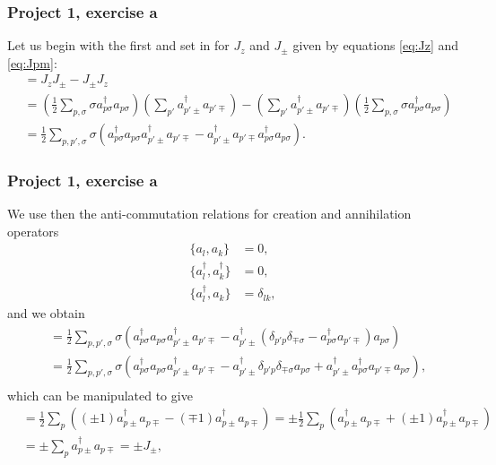 \documentclass[compress]{beamer}
\begin{document}
\frame
{
\frametitle{Project 1, exercise a}

\begin{small}
{\scriptsize
Let us begin with the first and set in for $J_z$ and $J_\pm$ given by equations \eqref{eq:Jz} and \eqref{eq:Jpm}:
\begin{align*}
[J_z,J_\pm] &= J_z J_\pm - J_\pm J_z \\
%
&= \left( \frac{1}{2}\sum_{p,\sigma} \sigma a_{p\sigma}^\dagger a_{p\sigma} \right)
\left( \sum_{p'} a_{p'\pm}^\dagger a_{p'\mp} \right) -
\left( \sum_{p'} a_{p'\pm}^\dagger a_{p'\mp} \right)
\left( \frac{1}{2}\sum_{p,\sigma} \sigma a_{p\sigma}^\dagger a_{p\sigma} \right) \\
%
&= \frac{1}{2} \sum_{p,p',\sigma} \sigma \left( a_{p\sigma}^\dagger a_{p\sigma} a_{p'\pm}^\dagger a_{p'\mp} - a_{p'\pm}^\dagger a_{p'\mp} a_{p\sigma}^\dagger a_{p\sigma} \right).
\end{align*}
%

}
\end{small}
}


\frame
{
\frametitle{Project 1, exercise a}

\begin{small}
{\scriptsize
We use then the anti-commutation relations for creation and annihilation operators
\begin{align}
\{ a_l,a_k \} &= 0, \label{eq:al,ak} \\
\{ a_l^\dagger , a_k^\dagger \} &= 0, \label{eq:ald,akd} \\
\{ a_l^\dagger , a_k \} &= \delta_{lk}, \label{eq:ald,ak}
\end{align}
and we obtain
%
\begin{align*}
[J_z,J_\pm] &= \frac{1}{2} \sum_{p,p',\sigma} \sigma \left(
a_{p\sigma}^\dagger a_{p\sigma} a_{p'\pm}^\dagger a_{p'\mp} -
a_{p'\pm}^\dagger \left( \delta_{p' p} \delta_{\mp \sigma} - a_{p\sigma}^\dagger a_{p'\mp} \right) a_{p\sigma} \right) \\
%
&= \frac{1}{2} \sum_{p,p',\sigma} \sigma \left(
a_{p\sigma}^\dagger a_{p\sigma} a_{p'\pm}^\dagger a_{p'\mp} -
a_{p'\pm}^\dagger \delta_{p' p} \delta_{\mp \sigma} a_{p\sigma} +
a_{p'\pm}^\dagger a_{p\sigma}^\dagger a_{p'\mp} a_{p\sigma} \right), \\
%
\end{align*}
which can be manipulated to give
\begin{align*}
[J_z,J_\pm] &= \frac{1}{2} \sum_p \left(
(\pm 1) a_{p\pm}^\dagger a_{p\mp} - (\mp 1)
a_{p\pm}^\dagger a_{p\mp} \right) =
%
\pm \frac{1}{2} \sum_p \left(
a_{p\pm}^\dagger a_{p\mp} + (\pm 1)
a_{p\pm}^\dagger a_{p\mp} \right) \\
%
&= \pm \sum_p a_{p\pm}^\dagger a_{p\mp} = \pm J_\pm,
\end{align*}
%
}
\end{small}
}
\end{document}
